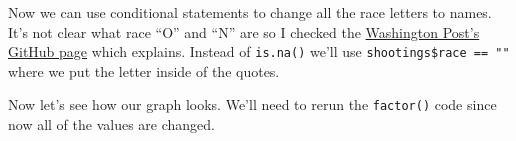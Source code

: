 \documentclass[
  12pt,
]{book}
\newenvironment{Shaded}{\begin{snugshade}}{\end{snugshade}}
\newcommand{\FunctionTok}[1]{\textcolor[rgb]{0,0,0}{#1}}
\newcommand{\NormalTok}[1]{#1}
\newcommand{\OtherTok}[1]{\textcolor[rgb]{0.37,0.37,0.37}{#1}}
\newcommand{\SpecialCharTok}[1]{\textcolor[rgb]{0,0,0}{#1}}
\newcommand{\StringTok}[1]{\textcolor[rgb]{0.5,0.5,0.5}{#1}}
\begin{document}
\begin{Shaded}
\end{Shaded}

Now we can use conditional statements to change all the race letters to names. It's not clear what race ``O'' and ``N'' are so I checked the \href{https://github.com/washingtonpost/data-police-shootings}{Washington Post's GitHub page} which explains. Instead of \texttt{is.na()} we'll use \texttt{shootings\$race\ ==\ ""} where we put the letter inside of the quotes.

\begin{Shaded}
\end{Shaded}

Now let's see how our graph looks. We'll need to rerun the \texttt{factor()} code since now all of the values are changed.
\end{document}
